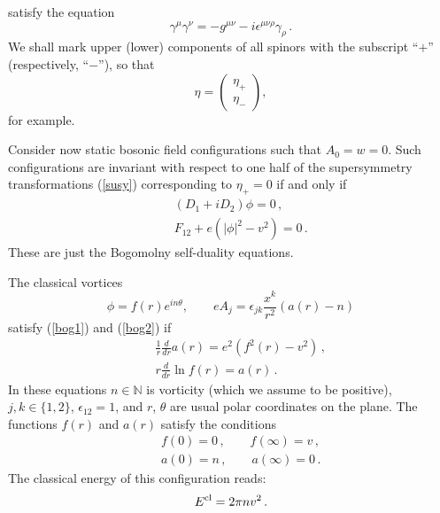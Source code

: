 \documentclass[a4paper,12pt]{article}
\begin{document}
satisfy the equation
\begin{equation}
\gamma^\mu \gamma^\nu =-g^{\mu\nu} -i\epsilon^{\mu\nu\rho}\gamma_\rho
\,.\label{gagag}
\end{equation}
We shall mark upper (lower) components of all spinors with the
subscript ``$+$'' (respectively, ``$-$''), so that
\begin{equation}
\eta=\left( \begin{array}{c} \eta_+ \\ \eta_- \end{array} \right),
\label{spinorcom}
\end{equation}
for example.

Consider now static bosonic field configurations such that $A_0=w=0$.
Such configurations are invariant with respect to one half of
the supersymmetry
transformations (\ref{susy}) corresponding to $\eta_+=0$ if and only
if
\begin{eqnarray}
&&(D_1+iD_2)\phi =0\,,\label{bog1}\\
&&F_{12}+e(|\phi |^2 -v^2 )=0 \,.\label{bog2}
\end{eqnarray}
These are just the Bogomolny \cite{Bogomolny:1975de}
self-duality equations.

The classical vortices 
\begin{equation}
\phi =f(r) e^{in\theta},\qquad eA_j=\epsilon_{jk} \frac {x^k}{r^2}
(a(r)-n) \label{vortex}
\end{equation}
satisfy (\ref{bog1}) and (\ref{bog2}) if 
\begin{eqnarray}
&&\frac 1r \frac{d}{dr} a(r)=e^2\left( f^2(r)-v^2 \right)\,,\nonumber\\
&&r \frac{d}{dr} \ln f(r) = a(r) \,.\label{af-eqs}
\end{eqnarray}
In these equations $n\in \mathbb{N}$ is vorticity 
(which we assume to be positive), $j,k\in \{1,2\}$, $\epsilon_{12}=1$,
and $r$, $\theta$ are usual polar coordinates on the plane. 
The functions $f(r)$ and $a(r)$ satisfy the conditions
\begin{eqnarray}
&& f(0)=0\,,\qquad f(\infty )=v \,,\label{cononf}\\
&& a(0)=n\,,\qquad a(\infty )=0 \,.\label{conona}
\end{eqnarray}
The classical energy of this configuration reads:
\begin{equation}
E^{\rm cl}=2\pi n v^2 \,.\label{Eclass}
\end{equation}
\end{document}
